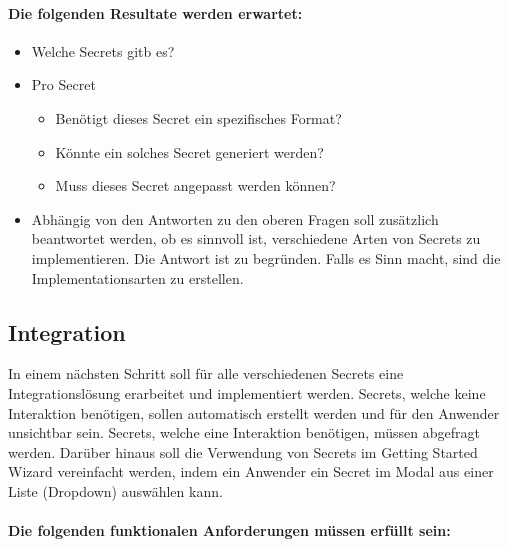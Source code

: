 \paragraph{Die folgenden Resultate werden erwartet:}
\begin{itemize}
    \item Welche Secrets gitb es?
    \item Pro Secret
        \begin{itemize}
              \item Benötigt dieses Secret ein spezifisches Format?
              \item Könnte ein solches Secret generiert werden?
              \item Muss dieses Secret angepasst werden können?
        \end{itemize}
    \item Abhängig von den Antworten zu den oberen Fragen soll zusätzlich beantwortet werden, ob es sinnvoll ist, verschiedene Arten von Secrets zu implementieren.
        Die Antwort ist zu begründen.
        Falls es Sinn macht, sind die Implementationsarten zu erstellen.
\end{itemize}

\subsection{Integration}\label{subsec:detailierte-aufgabenstellung-integration}
In einem nächsten Schritt soll für alle verschiedenen Secrets eine Integrationslösung erarbeitet und implementiert werden.
Secrets, welche keine Interaktion benötigen, sollen automatisch erstellt werden und für den Anwender unsichtbar sein.
Secrets, welche eine Interaktion benötigen, müssen abgefragt werden.
Darüber hinaus soll die Verwendung von Secrets im Getting Started Wizard vereinfacht werden, indem ein Anwender ein Secret im Modal aus einer Liste (Dropdown) auswählen kann.

\paragraph{Die folgenden funktionalen Anforderungen müssen erfüllt sein:}

